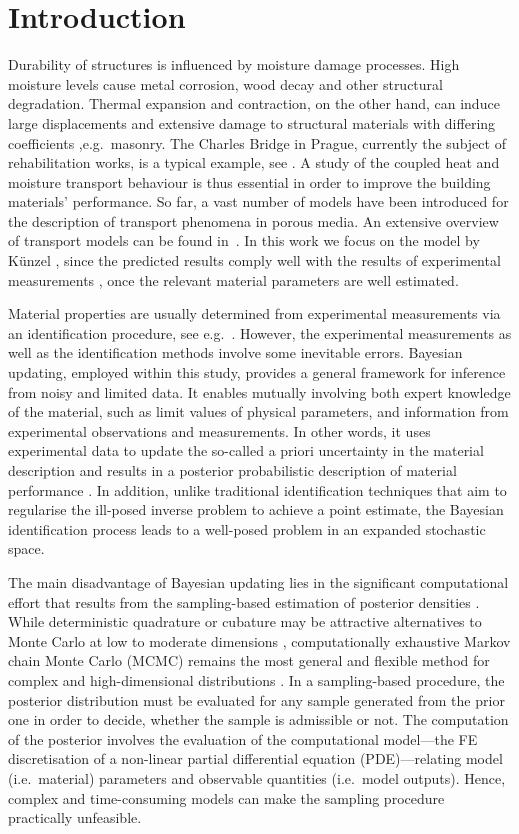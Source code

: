 \documentclass[preprint,12pt]{elsarticle}
\begin{document}
\section{Introduction}
\label{sec:intro}
Durability of structures is influenced by moisture damage processes.
High moisture levels cause metal corrosion, wood decay and other
structural degradation. Thermal expansion and contraction, on the
other hand, can induce large displacements and extensive damage to
structural materials with differing coefficients ,e.g.\ masonry.  The
Charles Bridge in Prague, currently the subject of rehabilitation
works, is a typical example, see \cite{Zeman:ES:2008}.  A study of the
coupled heat and moisture transport behaviour is thus essential in
order to improve the building materials' performance. So far, a vast
number of models have been introduced for the description of transport
phenomena in porous media.  An extensive overview of transport models
can be found in~\cite{Cerny:2002}. In this work we focus on the model
by K\"unzel \cite{Kunzel:1997}, since the predicted results comply
well with the results of experimental measurements
\cite{Sykora:2011:AMC}, once the relevant material parameters are well
estimated.

Material properties are usually determined from experimental
measurements via an identification procedure, see
e.g.~\cite{Kucerova:2007:PHD}.  However, the experimental measurements
as well as the identification methods involve some inevitable
errors. Bayesian updating, employed within this study, provides a
general framework for inference from noisy and limited data.  It
enables mutually involving both expert knowledge of the material, such
as limit values of physical parameters, and information from
experimental observations and measurements.  In other words, it uses
experimental data to update the so-called a priori uncertainty in the
material description and results in a posterior probabilistic
description of material performance \cite{Tarantola:2005}. In
addition, unlike traditional identification techniques that aim to
regularise the ill-posed inverse problem to achieve a point estimate,
the Bayesian identification process leads to a well-posed
problem in an expanded stochastic space.

The main disadvantage of Bayesian updating lies in the significant
computational effort that results from the sampling-based estimation of
posterior densities \cite{Mosegaard:2002:IHEES}.  While
deterministic quadrature or cubature may be attractive alternatives to
Monte Carlo at low to moderate dimensions \cite{Evans:1995:SS},
computationally exhaustive Markov chain Monte Carlo (MCMC) remains the
most general and flexible method for complex and high-dimensional
distributions \cite{Tierney:1994:AS, Gilks:1996}. In a sampling-based
procedure, the posterior distribution must be evaluated for any sample
generated from the prior one in order to decide, whether the sample is
admissible or not. The computation of the posterior involves the
evaluation of the computational model---the FE discretisation of a
non-linear partial differential equation (PDE)---relating model (i.e.\ material)
parameters and observable quantities (i.e.\ model outputs). Hence,
complex and time-consuming models can make the sampling procedure
practically unfeasible.
\end{document}
